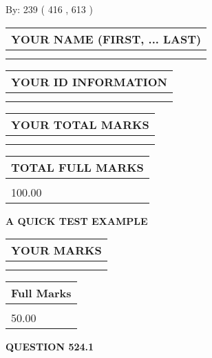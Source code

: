 \documentclass[12pt]{article}
\begin{document}
   
\hspace{1.0in} By: 
 239 ( 416 ,  613 )
   
   
   
   
\newpage 
\setcounter{page}{ 
   524001 } 
   
   
   
   
\noindent\begin{tabular}{|l|}
\hline
YOUR NAME (FIRST, ... LAST)  \\
\hline
 \\ 
 \\ 
\hline
\end{tabular}
\hspace{0.05in} \begin{tabular}{|l|}
\hline
 YOUR   ID   INFORMATION  \\
\hline
 \\ 
 \\ 
\hline
\end{tabular}
   
   
\vspace{0.2in}\noindent\begin{tabular}{|l|}
\hline
YOUR TOTAL MARKS  \\
\hline
 \\ 
 \\ 
\hline
\end{tabular}
\hspace{0.05in} \begin{tabular}{|l|}
\hline
TOTAL FULL MARKS  \\
\hline
 \\ 
100.00 \\
\hline
\end{tabular}
   
   
 \vspace{0.2in}
{\LARGE {\textbf{ A QUICK TEST EXAMPLE}}}
   
   
  
\vspace{0.2in}
  
\noindent\begin{tabular}{|l|}
\hline
 YOUR MARKS  \\
\hline
 \\ 
 \\ 
\hline
\end{tabular}
\hspace{0.05in} \begin{tabular}{|l|}
\hline
 Full Marks  \\
\hline
 \\ 
50.00 \\
\hline
\end{tabular}
{\textbf{\Large{QUESTION
524.1 
}}}
  
\end{document}
